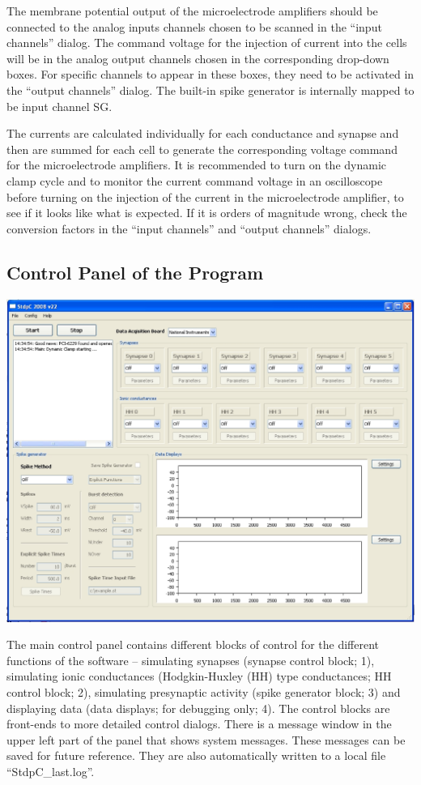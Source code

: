 \documentclass{article}
\begin{document}
The membrane potential output of the microelectrode amplifiers should
be connected to the analog inputs channels chosen to be scanned in the
``input channels'' dialog. The command voltage for the injection of
current into the cells will be in the analog output channels chosen in
the corresponding drop-down boxes. For specific channels to appear in
these boxes, they need to be activated in the ``output channels''
dialog. The built-in spike generator is internally mapped to be input
channel SG. 

The currents are calculated individually for each conductance and
synapse and then are summed for each cell to generate the
corresponding voltage command for the microelectrode amplifiers. It is
recommended to turn on the dynamic clamp cycle and to monitor the
current command voltage in an oscilloscope before turning on the
injection of the current in the microelectrode amplifier, to see if it
looks like what is expected. If it is orders of magnitude wrong, check
the conversion factors in the ``input channels'' and ``output
channels'' dialogs.

 
\subsection{Control Panel of the Program}

\parbox{\textwidth}{
  \includegraphics[width=\textwidth]{main}
}
\vspace*{0.5cm}

The main control panel contains different blocks of control for the
different functions of the software -- simulating synapses (synapse
control block; 1), simulating ionic conductances (Hodgkin-Huxley (HH)
type conductances; HH control block; 2), simulating presynaptic
activity (spike generator block; 3) and displaying data (data
displays; for debugging only; 4). The control blocks are front-ends to
more detailed control dialogs. There is a message window in the upper
left part of the panel that shows system messages. These messages can
be saved for future reference. They are also automatically written to
a local file ``StdpC\_last.log''.
\end{document}
